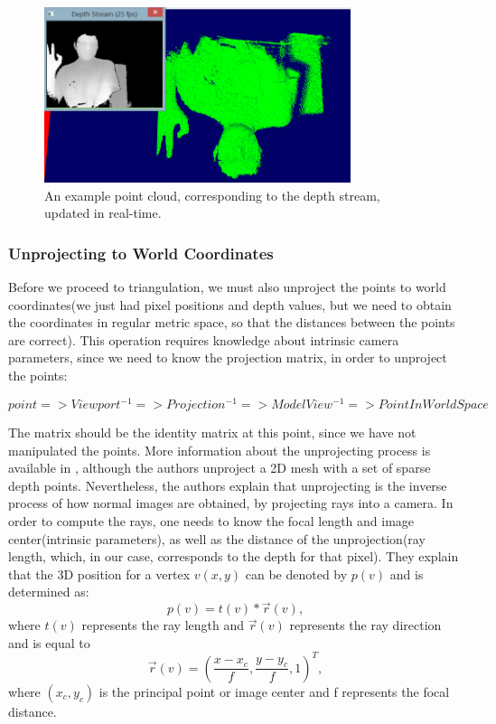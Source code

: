 \documentclass[]{article}
\begin{document}
\begin{figure}[hbtp]
    \centering
    \includegraphics[width=0.8\textwidth]{figures/PointCloud.PNG}
    \caption{An example point cloud, corresponding to the depth stream, updated in real-time.}
    \label{fig:PointCloud}
\end{figure}

\subsubsection{Unprojecting to World Coordinates}
\label{sec:unprojecting}

 Before we proceed to triangulation, we must also unproject the points to world coordinates(we just had pixel positions and depth values, but we need to obtain the coordinates in regular metric space, so that the distances between the points are correct). This operation requires knowledge about intrinsic camera parameters, since we need to know the projection matrix, in order to unproject the points:

$$point => Viewport^{-1} => Projection^{-1} => ModelView^{-1} => PointInWorldSpace$$

The  matrix should be the identity matrix at this point, since we have not manipulated the points.
More information about the unprojecting process is available in \cite{sung2013}, although the authors unproject a 2D mesh with a set of sparse depth points. Nevertheless, the authors explain that unprojecting is the inverse process of how normal images are obtained, by projecting rays into a camera. In order to compute the rays, one needs to know the focal length and image center(intrinsic parameters), as well as the distance of the unprojection(ray length, which, in our case, corresponds to the depth for that pixel). They explain that the 3D position for a vertex $v(x,y)$ can be denoted by $p(v)$ and is determined as:
$$p(v) = t(v) *\vec{r}(v),$$
where $t(v)$ represents the ray length and $\vec{r}(v)$ represents the ray direction and is equal to $$\vec{r}(v) = (\frac{x - x_{c}}{f},\frac{y-y_{c}}{f},1)^T,$$ where $(x_{c}, y_{c})$ is the principal point or image center and f represents the focal distance.
\end{document}
